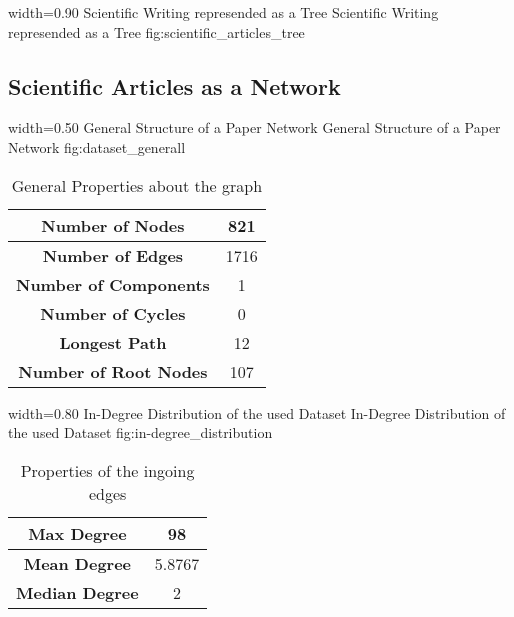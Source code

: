       {width=0.90\textwidth}
      {Scientific Writing represended as a Tree}
      {Scientific Writing represended as a Tree}
      {fig:scientific_articles_tree}

\subsection{Scientific Articles as a Network}
\label{sec:scientific_articles_as_a_network}

      {width=0.50\textwidth}
      {General Structure of a Paper Network}
      {General Structure of a Paper Network}
      {fig:dataset_generall}

\begin{table}
  \centering
  \begin{tabular}{ | c | c | }
    \hline
    \textbf{Number of Nodes} & 821 \\ \hline
    \textbf{Number of Edges} & 1716 \\ \hline
    \textbf{Number of Components} & 1 \\ \hline
    \textbf{Number of Cycles} & 0 \\ \hline
    \textbf{Longest Path} & 12 \\ \hline
    \textbf{Number of Root Nodes} & 107 \\ \hline
  \end{tabular}
  \caption[General Properties about the graph in the used dataset]{General Properties about the graph}
  \label{tbl:general_properties_about_the_graph}
\end{table}


      {width=0.80\textwidth}
      {In-Degree Distribution of the used Dataset}
      {In-Degree Distribution of the used Dataset}
      {fig:in-degree_distribution}

\begin{table}
  \centering
  \begin{tabular}{ | c | c | }
    \hline
    \textbf{Max Degree} & 98 \\ \hline
    \textbf{Mean Degree} & 5.8767 \\ \hline
    \textbf{Median Degree} & 2 \\ \hline
  \end{tabular}
  \caption[Properties of the ingoing edges in the used dataset]{Properties of the ingoing edges}
  \label{tbl:properties_ingoing_edges}
\end{table}

